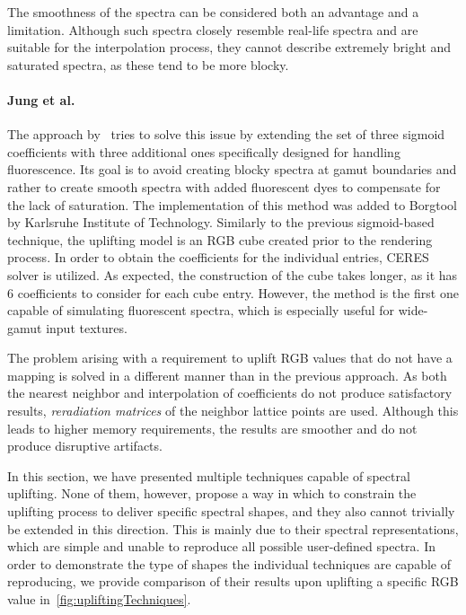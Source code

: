 The smoothness of the spectra can be considered both an advantage and a limitation. Although such spectra closely resemble real-life spectra and are suitable for the interpolation process, they cannot describe extremely bright and saturated spectra, as these tend to be more blocky.

\paragraph{Jung et al.} The approach by~\citet{upsamplingFluorescence} tries to solve this issue by extending the set of three sigmoid coefficients with three additional ones specifically designed for handling fluorescence. Its goal is to avoid creating blocky spectra at gamut boundaries and rather to create smooth spectra with added fluorescent dyes to compensate for the lack of saturation. The implementation of this method was added to Borgtool by Karlsruhe Institute of Technology. Similarly to the previous sigmoid-based technique, the uplifting model is an RGB cube created prior to the rendering process. In order to obtain the coefficients for the individual entries, CERES solver is utilized. As expected, the construction of the cube takes longer, as it has 6 coefficients to consider for each cube entry. However, the method is the first one capable of simulating fluorescent spectra, which is especially useful for wide-gamut input textures.

The problem arising with a requirement to uplift RGB values that do not have a mapping is solved in a different manner than in the previous approach. As both the nearest neighbor and interpolation of coefficients do not produce satisfactory results, \emph{reradiation matrices} of the neighbor lattice points are used. Although this leads to higher memory requirements, the results are smoother and do not produce disruptive artifacts. 

In this section, we have presented multiple techniques capable of spectral uplifting. None of them, however, propose a way in which to constrain the uplifting process to deliver specific spectral shapes, and they also cannot trivially be extended in this direction. This is mainly due to their spectral representations, which are simple and unable to reproduce all possible user-defined spectra. In order to demonstrate the type of shapes the individual techniques are capable of reproducing, we provide comparison of their results upon uplifting a specific RGB value in~\cref{fig:upliftingTechniques}.


